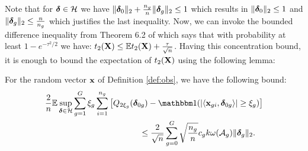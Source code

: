 Note that for $\ddelta \in \cH$ we have $\|\boldsymbol{\delta}_0\|_{2} + \frac{n_g}{n}\|\boldsymbol{\delta}_g\|_{2} \leq 1$ which results in $\|\boldsymbol{\delta}_0\|_{2} \leq 1$ and $\|\boldsymbol{\delta}_g\|_{2} \leq \frac{n}{n_g}$ which justifies the last inequality. 
Now, we can invoke the bounded difference inequality from Theorem 6.2 of \cite{boucheron13} which says that with probability at least $1 - e^{-\tau^2/2}$ we have: $t_2(\mathbf{X}) \leq \mathbb{E} t_2(\mathbf{X}) + \frac{\tau}{\sqrt{n}}$. 
Having this concentration bound, it is enough to bound the expectation of $t_2(\mathbf{X})$ using the following lemma:
\begin{lemma}
	\label{lemm:secTerm}
	For the random vector $\mathbf{x}$ of Definition \ref{def:obs}, we have the following bound:
	\begin{align}	
	\nr 
	&\frac{2}{n} \ex \sup_{\ddelta \in \cH} \sum_{g=1}^{G} \xi_g \sum_{i=1}^{n_g} \left[Q_{2 \xi_g}(\ddelta_{0g})  - \indic (|\langle \x_{gi}, \ddelta_{0g} \rangle| \geq \xi_g )  \right]
	\\ \nr 
	&\hspace*{4cm}\leq \frac{2}{\sqrt{n}} \sum_{g=0}^{G}  \sqrt{\frac{n_g}{n}} c_g k \omega(\cA_g) \norm{\ddelta_{g}}{2}.
	\end{align} 
\end{lemma}

